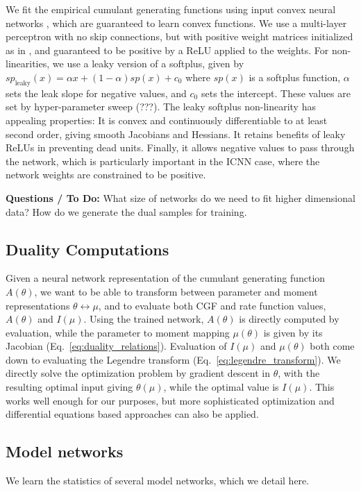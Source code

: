 \documentclass[11pt]{article}      %
\begin{document}
We fit the empirical cumulant generating functions using input convex neural networks \cite{amos_input_2017}, which are guaranteed to learn convex functions.
We use a multi-layer perceptron with no skip connections, but with positive weight matrices initialized as in \cite{hoedt_principled_2023}, and guaranteed to be positive by a ReLU applied to the weights.
For non-linearities, we use a leaky version of a softplus, given by $sp_{\textrm{leaky}}(x) = \alpha x + (1 - \alpha) sp(x) + c_0$ where $sp(x)$ is a softplus function, $\alpha$ sets the leak slope for negative values, and $c_0$ sets the intercept. 
These values are set by hyper-parameter sweep (???). 
The leaky softplus non-linearity has appealing properties:
It is convex and continuously differentiable to at least second order, giving smooth Jacobians and Hessians.
It retains benefits of leaky ReLUs in preventing dead units.
Finally, it allows negative values to pass through the network, which is particularly important in the ICNN case, where the network weights are constrained to be positive.

\noindent \textbf{Questions / To Do:}
What size of networks do we need to fit higher dimensional data?
How do we generate the dual samples for training.


\subsection{Duality Computations} \label{sec:duality_computation}
Given a neural network representation of the cumulant generating function $A(\theta)$, we want to be able to transform between parameter and moment representations $\theta \leftrightarrow \mu$, and to evaluate both CGF and rate function values, $A(\theta)$ and $I(\mu)$.
Using the trained network, $A(\theta)$ is directly computed by evaluation, while the parameter to moment mapping $\mu(\theta)$ is given by its Jacobian (Eq.~\ref{eq:duality_relations}).
Evaluation of $I(\mu)$ and $\mu(\theta)$ both come down to evaluating the Legendre transform (Eq.~\ref{eq:legendre_transform}). 
We directly solve the optimization problem by gradient descent in $\theta$, with the resulting optimal input giving $\theta(\mu)$, while the optimal value is $I(\mu)$.
This works well enough for our purposes, but more sophisticated optimization and differential equations based approaches can also be applied.


\subsection{Model networks} \label{sec:model_network_details}
We learn the statistics of several model networks, which we detail here.
\end{document}
